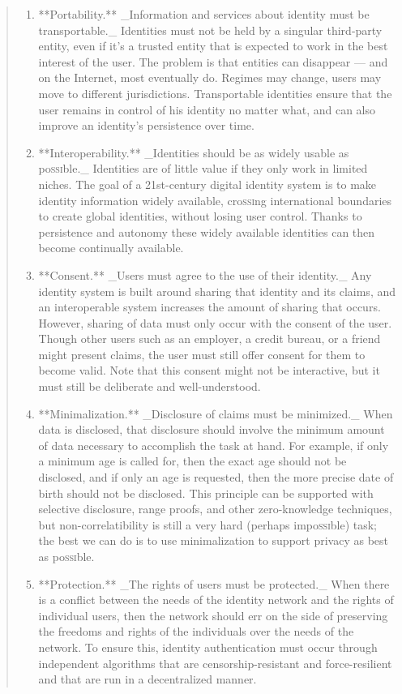 \documentclass[twoside]{article}
\begin{document}
\begin{quote}
\begin{enumerate}
    \item **Portability.** _Information and services about identity must be transportable._ Identities must not be held by a singular third-party entity, even if it’s a trusted entity that is expected to work in the best interest of the user. The problem is that entities can disappear — and on the Internet, most eventually do. Regimes may change, users may move to different jurisdictions. Transportable identities ensure that the user remains in control of his identity no matter what, and can also improve an identity’s persistence over time.
    \item **Interoperability.** _Identities should be as widely usable as po\textsc{ssi}ble._ Identities are of little value if they only work in limited niches. The goal of a 21st-century digital identity system is to make identity information widely available, cro\textsc{ssi}ng international boundaries to create global identities, without losing user control. Thanks to persistence and autonomy these widely available identities can then become continually available.
    \item **Consent.** _Users must agree to the use of their identity._ Any identity system is built around sharing that identity and its claims, and an interoperable system increases the amount of sharing that occurs. However, sharing of data must only occur with the consent of the user. Though other users such as an employer, a credit bureau, or a friend might present claims, the user must still offer consent for them to become valid. Note that this consent might not be interactive, but it must still be deliberate and well-understood.
    \item **Minimalization.** _Disclosure of claims must be minimized._ When data is disclosed, that disclosure should involve the minimum amount of data necessary to accomplish the task at hand. For example, if only a minimum age is called for, then the exact age should not be disclosed, and if only an age is requested, then the more precise date of birth should not be disclosed. This principle can be supported with selective disclosure, range proofs, and other zero-knowledge techniques, but non-correlatibility is still a very hard (perhaps impo\textsc{ssi}ble) task; the best we can do is to use minimalization to support privacy as best as po\textsc{ssi}ble.
    \item **Protection.** _The rights of users must be protected._ When there is a conflict between the needs of the identity network and the rights of individual users, then the network should err on the side of preserving the freedoms and rights of the individuals over the needs of the network. To ensure this, identity authentication must occur through independent algorithms that are censorship-resistant and force-resilient and that are run in a decentralized manner.
  \end{enumerate}
\end{quote}
\end{document}
